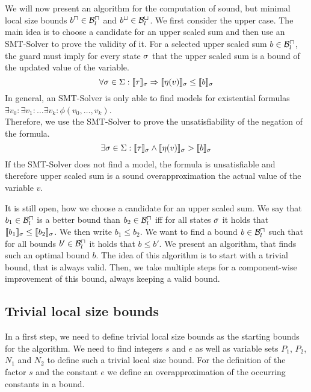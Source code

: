 We will now present an algorithm for the computation of sound, but minimal local size bounds $b^\sqcap \in \mathcal{B}^\sqcap_l$ and $b^\sqcup \in \mathcal{B}^\sqcup_l$.
We first consider the upper case.
The main idea is to choose a candidate for an upper scaled sum and then use an SMT-Solver to prove the validity of it.
For a selected upper scaled sum $b \in \mathcal{B}^\sqcap_l$, the guard must imply for every state $\sigma$ that the upper scaled sum is a bound of the updated value of the variable.
\[ \forall \sigma \in \Sigma: \llbracket \tau \rrbracket_{\sigma} \Rightarrow \llbracket \eta(v) \rrbracket_{\sigma} \leq \llbracket b \rrbracket_{\sigma} \]
In general, an SMT-Solver is only able to find models for existential formulas $\exists v_0: \exists v_1: \dots \exists v_k: \phi(v_0, \dots, v_k)$. \cite{smt} \\
Therefore, we use the SMT-Solver to prove the unsatisfiability of the negation of the formula.
\[ \exists \sigma \in \Sigma: \llbracket \tau \rrbracket_{\sigma} \wedge \llbracket \eta(v) \rrbracket_{\sigma} > \llbracket b \rrbracket_{\sigma} \]
If the SMT-Solver does not find a model, the formula is unsatisfiable and therefore upper scaled sum is a sound overapproximation the actual value of the variable $v$.

It is still open, how we choose a candidate for an upper scaled sum.
We say that $b_1 \in \mathcal{B}^\sqcap_l$ is a better bound than $b_2 \in \mathcal{B}^\sqcap_l$ iff for all states $\sigma$ it holds that $\llbracket b_1 \rrbracket_{\sigma} \leq \llbracket b_2 \rrbracket_{\sigma}$.
We then write $b_1 \leq b_2$.
We want to find a bound $b \in \mathcal{B}^\sqcap_l$ such that for all bounds $b' \in \mathcal{B}^\sqcap_l$ it holds that $b \leq b'$.
We present an algorithm, that finds such an optimal bound $b$.
The idea of this algorithm is to start with a trivial bound, that is always valid.
Then, we take multiple steps for a component-wise improvement of this bound, always keeping a valid bound.

\subsection{Trivial local size bounds}

In a first step, we need to define trivial local size bounds as the starting bounds for the algorithm.
We need to find integers $s$ and $e$ as well as variable sets $P_1$, $P_2$, $N_1$ and $N_2$ to define such a trivial local size bound.
For the definition of the factor $s$ and the constant $e$ we define an overapproximation of the occurring constants in a bound.

